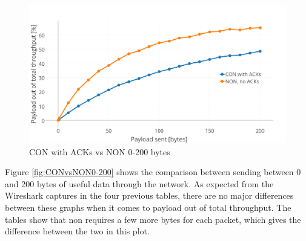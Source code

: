 



\begin{figure}[ht]
    \centering
    \includegraphics[width=1.0\textwidth]{CONNONvs0-200acks.png}    
    \caption{CON with ACKs vs NON 0-200 bytes}
    \label{fig:CONvsNON0-200_acks}
\end{figure}

\noindent Figure \ref{fig:CONvsNON0-200} shows the comparison between sending between 0 and 200 bytes of useful data through the network. As expected from the Wireshark captures in the four previous tables, there are no major differences between these graphs when it comes to payload out of total throughput. The tables show that \gls{non} requires a few more bytes for each packet, which gives the difference between the two in this plot. 



